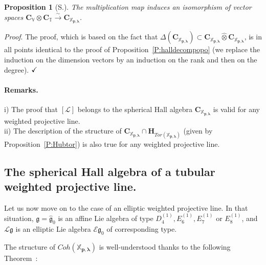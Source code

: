 \documentclass[a4paper,10pt]{amsart}
\def\H{\mathbf{H}}
\def\qed{$\hfill \checkmark$}
\def\CC{\mathbf{C}}
\def\g{\mathfrak{g}}
\def\xpl{\mathbb{X}_{\mathbf{p},\boldsymbol{\lambda}}}
\newtheorem{prop}[theo]{Proposition}
\numberwithin{equation}{section}
\begin{document}
{\vspace{.1in}

\begin{prop}[S.] The multiplication map induces an isomorphism of vector spaces $\CC_{\mathbb{V}} \otimes \CC_{\mathbb{T}} \stackrel{\sim}{\to} \CC_{\xpl}$.\end{prop}
\noindent
\textit{Proof}. The proof, which is based on the fact that $\Delta(\CC_{\xpl}) \subset \CC_{\xpl} \widehat{\otimes} \CC_{\xpl}$, is in all points identical to the proof of Proposition~\ref{P:halldecompopo} (we replace the induction on the dimension vectors by an induction on the rank and then on the degree).
\qed

\vspace{.15in}

\addtocounter{theo}{1}
\paragraph{\textbf{Remarks. \thetheo}} i) The proof that $[\mathcal{L}]$ belongs to the spherical Hall algebra $\CC_{\xpl}$ is valid for any weighted projective line.\\
ii) The description of the structure of $\mathbf{C}_{\xpl} \cap \H_{Tor(\xpl)}$ (given by Proposition~\ref{P:Hubtor}) is also true for any weighted projective line.

\vspace{.2in}

\subsection{The spherical Hall algebra of a tubular weighted projective line.}

\vspace{.15in}

Let us now move on to the case of an elliptic weighted projective line. In that situation, $\g=\widehat{\g}_0$ is an affine Lie algebra of type $D_4^{(1)}, E_6^{(1)},E_7^{(1)}$ or $E_8^{(1)}$, and $\mathcal{L}\g$ is an elliptic Lie algebra $\mathcal{E}{\g_0}$ of corresponding type.

\vspace{.1in}

The structure of $Coh(\xpl)$ is well-understood thanks to the following Theorem~:

}
\end{document}
